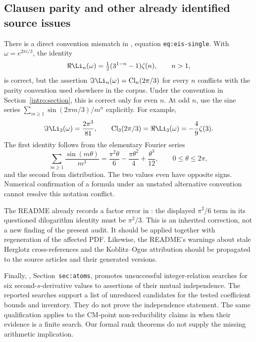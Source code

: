\subsection{Clausen parity and other already identified source issues}
\label{audit:additional}

There is a direct convention mismatch in
, equation
\texttt{eq:eis-single}. With $\omega=e^{2\pi i/3}$, the identity
\[
 \Re\Li_n(\omega)=\tfrac12(3^{1-n}-1)\zeta(n),\qquad n>1,
\]
is correct, but the assertion
$\Im\Li_n(\omega)=\operatorname{Cl}_n(2\pi/3)$ for every $n$
conflicts with the parity convention used elsewhere in the corpus.
Under the convention in Section~\ref{intro:section}, this is correct
only for even $n$. At odd $n$, use the sine series
$\sum_{m\geq1}\sin(2\pi m/3)/m^n$ explicitly. For example,
\begin{equation}\label{audit:clausen-three}
 \Im\Li_3(\omega)=\frac{2\pi^3}{81},
 \qquad
 \operatorname{Cl}_3(2\pi/3)=\Re\Li_3(\omega)
                         =-\frac49\zeta(3).
\end{equation}
The first identity follows from the elementary Fourier series
\[
 \sum_{m\geq1}\frac{\sin(m\theta)}{m^3}
 =\frac{\pi^2\theta}{6}-\frac{\pi\theta^2}{4}
                         +\frac{\theta^3}{12},
 \qquad 0\leq\theta\leq2\pi,
\]
and the second from distribution. The two values even have opposite
signs. Numerical confirmation of a formula under an unstated
alternative convention cannot resolve this notation conflict.

The README already records a factor error in :
the displayed $\pi^2/6$ term in its questioned dilogarithm identity
must be $\pi^2/3$. This is an inherited correction, not a new finding
of the present audit. It should be applied together with regeneration
of the affected PDF. Likewise, the README's warnings about stale
Herglotz cross-references and the Koblitz--Ogus attribution should be
propagated to the source articles and their generated versions.

Finally, ,
Section~\texttt{sec:atoms}, promotes unsuccessful integer-relation
searches for six second-$s$-derivative values to assertions of their
mutual independence. The reported searches support a list of
unreduced candidates for the tested coefficient bounds and inventory.
They do not prove the independence statement. The same qualification
applies to the CM-point non-reducibility claims in
 when their evidence is a
finite search. Our formal rank theorems do not supply the missing
arithmetic implication.

